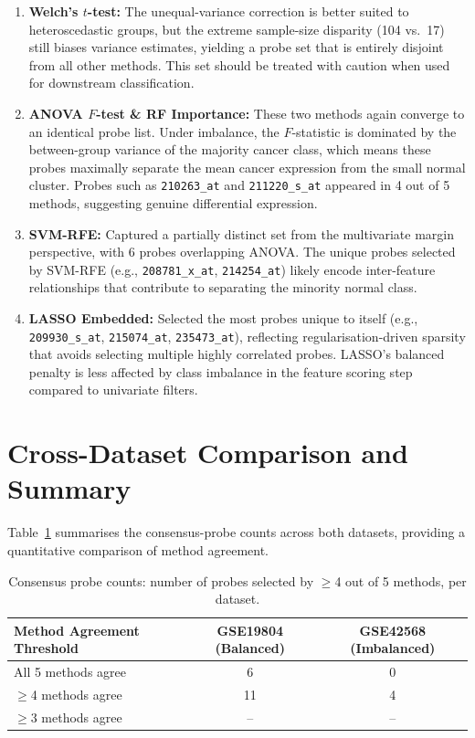 \begin{enumerate}
    \item \textbf{Welch's $t$-test:} The unequal-variance correction is better suited to heteroscedastic groups, but the extreme sample-size disparity (104 vs.\ 17) still biases variance estimates, yielding a probe set that is entirely disjoint from all other methods. This set should be treated with caution when used for downstream classification.

    \item \textbf{ANOVA $F$-test \& RF Importance:} These two methods again converge to an identical probe list. Under imbalance, the $F$-statistic is dominated by the between-group variance of the majority cancer class, which means these probes maximally separate the mean cancer expression from the small normal cluster. Probes such as \texttt{210263\_at} and \texttt{211220\_s\_at} appeared in 4 out of 5 methods, suggesting genuine differential expression.

    \item \textbf{SVM-RFE:} Captured a partially distinct set from the multivariate margin perspective, with 6 probes overlapping ANOVA. The unique probes selected by SVM-RFE (e.g., \texttt{208781\_x\_at}, \texttt{214254\_at}) likely encode inter-feature relationships that contribute to separating the minority normal class.

    \item \textbf{LASSO Embedded:} Selected the most probes unique to itself (e.g., \texttt{209930\_s\_at}, \texttt{215074\_at}, \texttt{235473\_at}), reflecting regularisation-driven sparsity that avoids selecting multiple highly correlated probes. LASSO's balanced penalty is less affected by class imbalance in the feature scoring step compared to univariate filters.
\end{enumerate}

\section{Cross-Dataset Comparison and Summary}

Table~\ref{tab:cross_dataset_consensus} summarises the consensus-probe counts across both datasets, providing a quantitative comparison of method agreement.

\begin{table}[H]
\centering
\caption{Consensus probe counts: number of probes selected by $\geq$4 out of 5 methods, per dataset.}
\label{tab:cross_dataset_consensus}
\begin{tabular}{lcc}
\toprule
\textbf{Method Agreement Threshold} & \textbf{GSE19804 (Balanced)} & \textbf{GSE42568 (Imbalanced)} \\
\midrule
All 5 methods agree       & 6  & 0 \\
$\geq$4 methods agree     & 11 & 4 \\
$\geq$3 methods agree     & --  & -- \\
\bottomrule
\end{tabular}
\end{table}

